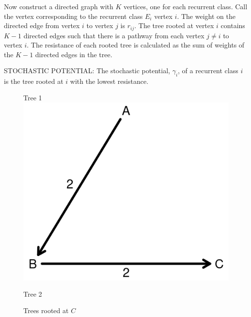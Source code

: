 Now construct a directed graph with $K$ vertices, one for each recurrent class. Call the vertex corresponding to the recurrent class $E_i$ vertex $i$. The weight on the directed edge from vertex $i$ to vertex $j$ is $r_{ij}$. The tree rooted at vertex $i$ contains $K-1$ directed edges such that there is a pathway from each vertex $j \neq i$ to vertex $i$. The resistance of each rooted tree is calculated as the sum of weights of the $K-1$ directed edges in the tree. 

\begin{definition}
    STOCHASTIC POTENTIAL: The stochastic potential, $\gamma_i$, of a recurrent class $i$ is the tree rooted at $i$ with the lowest resistance.
\end{definition}

\begin{figure}[h]
\captionsetup{justification=centering}
  \caption[caption]{Trees rooted at $C$}
   \label{fig:TreesTheory2}
\vskip12pt
\begin{minipage}[c]{.32\textwidth}
\centering
Tree 1
\vskip6pt
\includegraphics[width = \textwidth]{Images/Tree1.png}
\end{minipage}
\begin{minipage}[c]{.32\textwidth}
\centering
Tree 2
\vskip6pt

\end{minipage}
\end{figure}
